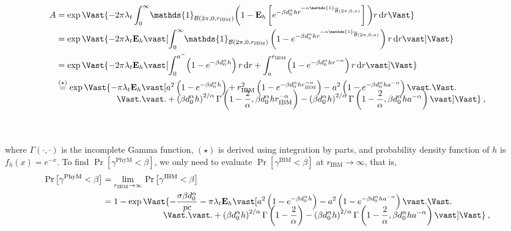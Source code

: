\documentclass[12pt, draftclsnofoot, onecolumn]{IEEEtran}
\begin{document}
\begin{align}\label{eq: IBM-2}
A & = \exp\Vast\{-2 \pi  \lambda_t  \int_{0}^{\infty} \! \mathds{1}_{\mathcal{B}(2\pi,0,r_{\mathrm{IBM}})} \bigg( 1 - \mathbf{E}_h \left[e^{- \beta d_{0}^{\alpha} h r^{-\alpha \mathds{1}_{\overline{\mathcal{B}}(2\pi,0,a)}}} \right] \bigg) r \, \mathrm{d}r \Vast\} \nonumber \\
& = \exp\Vast\{-2 \pi  \lambda_t  \mathbf{E}_h \vast[\int_{0}^{\infty} \! \mathds{1}_{\mathcal{B}(2\pi,0,r_{\mathrm{IBM}})} \left( 1 - e^{- \beta d_{0}^{\alpha} h r^{-\alpha \mathds{1}_{\overline{\mathcal{B}}(2\pi,0,a)}}} \right) r \, \mathrm{d}r \vast] \Vast\} \nonumber \\
& = \exp\Vast\{-2 \pi  \lambda_t  \mathbf{E}_h \vast[\int_{0}^{a^{-}} \! \left( 1 - e^{- \beta d_{0}^{\alpha} h} \right) r \, \mathrm{d}r + \int_{a}^{r_{\mathrm{IBM}}} \! \left( 1 - e^{- \beta d_{0}^{\alpha} h r^{-\alpha}} \right) r \, \mathrm{d}r \vast] \Vast\} \nonumber \\
& \stackrel{(\star)}{=} \exp\Vast\{-\pi  \lambda_t  \mathbf{E}_h \vast[ a^2 \left( 1 - e^{- \beta d_{0}^{\alpha} h} \right) + r_{\mathrm{IBM}}^2 \left( 1 - e^{- \beta d_{0}^{\alpha} h r_{\mathrm{IBM}}^{-\alpha}} \right)
- a^2 \left( 1 - e^{- \beta d_{0}^{\alpha} h a^{-\alpha}} \right) \vast. \Vast. \nonumber \\[-4mm]
& \hspace{25mm} \Vast. \vast. + \left( \beta d_{0}^{\alpha} h \right)^{2/\alpha} \Gamma\left( 1 - \frac{2}{\alpha}, \beta d_{0}^{\alpha} h r_{\mathrm{IBM}}^{-\alpha} \right)
- \left( \beta d_{0}^{\alpha} h \right)^{2/\alpha} \Gamma\left( 1 - \frac{2}{\alpha}, \beta d_{0}^{\alpha} h a^{-\alpha} \right) \vast] \Vast\}  \:, \\[6mm]
& \nonumber
\end{align}
where $\Gamma\left(\cdot, \cdot \right)$ is the incomplete Gamma function, $(\star)$ is derived using integration by parts, and probability density function of $h$ is $f_h(x) = e^{-x}$.
To find $\Pr \left[\gamma^{\mathrm{PhyM}} < \beta \right]$, we only need to evaluate $\Pr \left[\gamma^{\mathrm{IBM}} < \beta \right]$ at $r_{\mathrm{IBM}} \to \infty$, that is,
\begin{align}\label{eq: PhyM-1}
\Pr \left[\gamma^{\mathrm{PhyM}} < \beta \right] & = \lim_{r_{\mathrm{IBM}} \to \infty} \, \Pr\left[\gamma^{\mathrm{IBM}} < \beta \right] \nonumber \\
&= 1 - \exp\Vast\{ - \frac{\sigma \beta d_{0}^{\alpha}}{pc} - \pi  \lambda_t  \mathbf{E}_h \vast[ a^2 \left( 1 - e^{- \beta d_{0}^{\alpha} h} \right) - a^2 \left( 1 - e^{- \beta d_{0}^{\alpha} h a^{-\alpha}} \right) \vast. \Vast. \nonumber \\[-4mm]
& \hspace{25mm} \Vast. \vast. + \left( \beta d_{0}^{\alpha} h \right)^{2/\alpha} \Gamma\left( 1 - \frac{2}{\alpha} \right)
- \left( \beta d_{0}^{\alpha} h \right)^{2/\alpha} \Gamma\left( 1 - \frac{2}{\alpha}, \beta d_{0}^{\alpha} h a^{-\alpha} \right) \vast] \Vast\}  \:,
\end{align}
\end{document}
